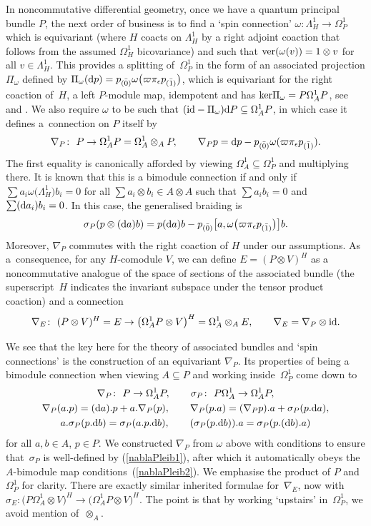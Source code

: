 \documentclass[pdftex]{sigma}
\numberwithin{equation}{section}
\newcommand{\<}{{\langle}}
\renewcommand{\>}{{\rangle}}
\renewcommand{\ker}{{\rm{ker}}}
\newcommand{\tens}{\otimes}
\newcommand{\id}{{\rm id}}
\newcommand{\extd}{{\rm d}}
\newcommand{\eps}{\epsilon}
\newcommand{\co}{{}_{\scriptstyle \bar{(1)}}}
\newcommand{\rz}{{}_{\scriptstyle \bar{(0)}}}
\newcommand{\ver}{{\rm ver}}
\begin{document}
In noncommutative differential geometry, once we have a quantum principal bundle $P$, the next order of business is to find a `spin connection' $\omega\colon \Lambda^1_H\to \Omega^1_P$ which is equivariant (where $H$ coacts on $\Lambda^1_H$ by a right adjoint coaction that follows from the assumed $\Omega^1_H$ bicovariance) and such that $\ver(\omega(v))=1\tens v$ for all $v\in\Lambda^1_H$. This provides a splitting of~$\Omega^1_P$ in the form of an associated projection $\Pi_\omega$ defined by $\Pi_\omega(\extd p)=p\rz\omega\big(\varpi\pi_\eps p\co\big)$, which is equivariant for the right coaction of~$H$, a left $P$-module map, idempotent and has $\ker\Pi_\omega=P\Omega^1_AP$, see~\cite{BrzMa} and \cite[Chapter~5]{BegMa}. We also require $\omega$ to be such that $(\id-\Pi_\omega)\extd P\subseteq \Omega^1_AP$, in which case it defines a~connection on $P$ itself by
\[ \nabla_P\colon \ P\to \Omega^1_AP=\Omega^1_A\tens_A P,\qquad \nabla_P p= \extd p- p\rz\omega(\varpi\pi_\eps p\co).\]
The first equality is canonically afforded by viewing $\Omega^1_A\subseteq\Omega^1_P$ and multiplying there.
It is known\cite[Proposition~5.50]{BegMa} that this is a bimodule connection if and only if $\sum a_i\omega\big(\Lambda^1_H\big)b_i=0$ for all $\sum a_i \tens b_i\in A\tens A$ such that $\sum a_ib_i=0$ and $\sum (\extd a_i)b_i=0$. In this case, the generalised braiding is
\[ \sigma_P(p\tens (\extd a) b)= p(\extd a)b-p\rz \big[a,\omega\big(\varpi\pi_\eps p\co\big)\big]b.\]
Moreover, $\nabla_P$ commutes with the right coaction of $H$ under our assumptions. As a~consequence, for any $H$-comodule $V$, we can define $E=(P\tens V)^H$ as a noncommutative analogue of the space of sections of the associated bundle (the superscript~$H$ indicates the invariant subspace under the tensor product coaction) and a connection~\cite{BegMa, BrzMa}
\[ \nabla_E\colon \ (P\tens V)^H=E\to \big(\Omega^1_A P\tens V\big)^H=\Omega^1_A\tens_A E,\qquad \nabla_E=\nabla_P\tens \id.\]

We see that the key here for the theory of associated bundles and `spin connections' is the construction of an equivariant $\nabla_P$. Its properties of being a bimodule connection when viewing $A\subseteq P$ and working inside~$\Omega^1_P$ come down to
\begin{gather} \nabla_P\colon \ P\to \Omega^1_AP,\qquad \sigma_P\colon \ P\Omega^1_A\to \Omega^1_AP,\nonumber\\
 \label{nablaPleib1} \nabla_P(a.p) =(\extd a).p+ a.\nabla_P(p),\qquad \nabla_P(p.a)=(\nabla_P p).a+ \sigma_P(p.\extd a),\\ \label{nablaPleib2} a.\sigma_P(p.\extd b) =\sigma_P(a.p.\extd b),\qquad (\sigma_P(p.\extd b)).a=\sigma_P(p.(\extd b).a)\end{gather}
 for all $a,b\in A$, $p\in P$. We constructed $\nabla_P$ from $\omega$ above with conditions to ensure that~$\sigma_P$ is well-defined by (\ref{nablaPleib1}), after which it automatically obeys the $A$-bimodule map conditions~(\ref{nablaPleib2}). We emphasise the product of $P$ and $\Omega^1_P$ for clarity. There are exactly similar inherited formulae for~$\nabla_E$, now with $\sigma_E\colon \big(P\Omega^1_A\tens V\big)^H\to \big(\Omega^1_AP\tens V\big)^H$. The point is that by working `upstairs' in~$\Omega^1_P$, we avoid mention of~$\tens_A$.
\end{document}
